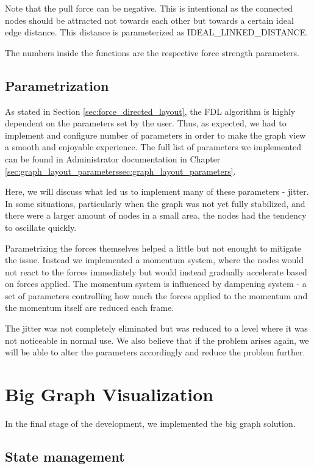 Note that the pull force can be negative. This is intentional as the connected nodes should be attracted not towards each other but towards a certain ideal edge distance.
This distance is parameterized as IDEAL\_LINKED\_DISTANCE.

The numbers inside the functions are the respective force strength parameters.

\subsection{Parametrization}
As stated in Section \ref{sec:force_directed_layout}, the FDL algorithm is highly dependent on the parameters set by the user.
Thus, as expected, we had to implement and configure number of parameters in order to make the graph view a smooth and enjoyable experience.
The full list of parameters we implemented can be found in Administrator documentation in Chapter \ref{sec:graph_layout_parameterssec:graph_layout_parameters}.

Here, we will discuss what led us to implement many of these parameters - jitter.
In some situations, particularly when the graph was not yet fully stabilized, and there were a larger amount of nodes in a small area,
the nodes had the tendency to oscillate quickly.

Parametrizing the forces themselves helped a little but not enought to mitigate the issue.
Instead we implemented a momentum system, where the nodes would not react to the forces immediately but would instead gradually accelerate based on forces applied.
The momentum system is influenced by dampening system - a set of parameters controlling how much the forces applied to the momentum and the momentum itself are reduced each frame.

The jitter was not completely eliminated but was reduced to a level where it was not noticeable in normal use.
We also believe that if the problem arises again, we will be able to alter the parameters accordingly and reduce the problem further.

\section{Big Graph Visualization}
\label{sec:big_graph_implementation}

In the final stage of the development, we implemented the big graph solution.

\subsection*{State management}

